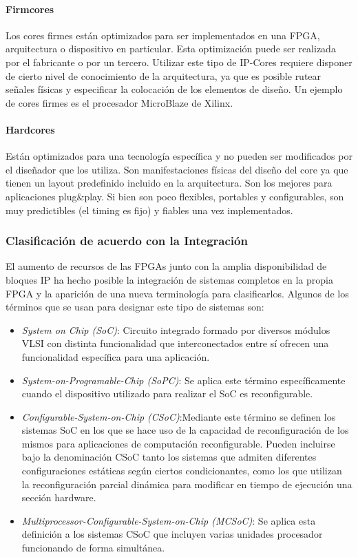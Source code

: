 			\paragraph{Firmcores}
			Los cores firmes están optimizados para ser implementados en una FPGA, arquitectura o dispositivo en particular. Esta optimización puede ser
			realizada por el fabricante o por un tercero. Utilizar este tipo de IP-Cores requiere disponer de cierto nivel de conocimiento de la arquitectura,
			ya que es posible rutear señales físicas y especificar la colocación de los elementos de diseño. Un ejemplo de cores firmes es el procesador
			MicroBlaze de Xilinx.\cite{Etiqueta04}

			\paragraph{Hardcores}
			Están optimizados para una tecnología específica y no pueden ser modificados por el diseñador que los utiliza. Son manifestaciones físicas del
			diseño del core ya que tienen un layout predefinido incluido en la arquitectura. Son los mejores para aplicaciones plug\&play. Si bien son poco
			flexibles, portables y configurables, son muy predictibles (el timing es fijo) y fiables una vez implementados.

		\subsubsection{Clasificación de acuerdo con la Integración}
		El aumento de recursos de las FPGAs junto con la amplia disponibilidad de bloques IP ha hecho posible la integración de sistemas completos en la
		propia FPGA y la aparición de una nueva terminología para clasificarlos. Algunos de los términos que se usan para designar este tipo de sistemas
		son:
		\begin {itemize}
		\item 
		\textit{System on Chip (SoC)}:
 		Circuito integrado formado por diversos módulos VLSI con distinta funcionalidad que interconectados entre sí ofrecen una funcionalidad específica
 		para una aplicación.
		\item 
		\textit{System-on-Programable-Chip (SoPC)}: Se aplica este término específicamente cuando el dispositivo utilizado para realizar el SoC es
		reconfigurable.
		\item 
		\textit{Configurable-System-on-Chip (CSoC)}:Mediante este término se definen los sistemas SoC en los que se hace uso de la capacidad de
		reconfiguración de los mismos para aplicaciones de computación reconfigurable. Pueden incluirse bajo la denominación CSoC tanto los sistemas que
		admiten diferentes configuraciones estáticas según ciertos condicionantes, como los que utilizan la reconfiguración parcial dinámica para modificar
		en tiempo de ejecución una sección hardware.
		\item 
		\textit{Multiprocessor-Configurable-System-on-Chip (MCSoC)}: Se aplica esta definición a los sistemas CSoC que incluyen varias unidades procesador
		funcionando de forma simultánea.
 		\end {itemize}

